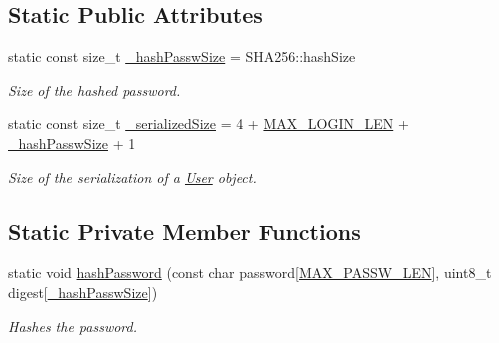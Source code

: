 \subsection*{Static Public Attributes}
\begin{DoxyCompactItemize}
\item 
\hypertarget{classUser_a2869314c4d5d41923d74150bea362140}{}static const size\+\_\+t \hyperlink{classUser_a2869314c4d5d41923d74150bea362140}{\+\_\+hash\+Passw\+Size} = S\+H\+A256\+::hash\+Size\label{classUser_a2869314c4d5d41923d74150bea362140}

\begin{DoxyCompactList}\small\item\em Size of the hashed password. \end{DoxyCompactList}\item 
\hypertarget{classUser_aded927fdcb2eacbe716c4fed1ed328ab}{}static const size\+\_\+t \hyperlink{classUser_aded927fdcb2eacbe716c4fed1ed328ab}{\+\_\+serialized\+Size} = 4 + \hyperlink{user_8hpp_a43842dcd60d621d7d9c9b9e4ecd76f78}{M\+A\+X\+\_\+\+L\+O\+G\+I\+N\+\_\+\+L\+E\+N} + \hyperlink{classUser_a2869314c4d5d41923d74150bea362140}{\+\_\+hash\+Passw\+Size} + 1\label{classUser_aded927fdcb2eacbe716c4fed1ed328ab}

\begin{DoxyCompactList}\small\item\em Size of the serialization of a \hyperlink{classUser}{User} object. \end{DoxyCompactList}\end{DoxyCompactItemize}
\subsection*{Static Private Member Functions}
\begin{DoxyCompactItemize}
\item 
\hypertarget{classUser_a653dfb41ba6ebce7769a448cfeb8c278}{}static void \hyperlink{classUser_a653dfb41ba6ebce7769a448cfeb8c278}{hash\+Password} (const char password\mbox{[}\hyperlink{user_8hpp_a510de8d20fed46d05c63ed414e8b595f}{M\+A\+X\+\_\+\+P\+A\+S\+S\+W\+\_\+\+L\+E\+N}\mbox{]}, uint8\+\_\+t digest\mbox{[}\hyperlink{classUser_a2869314c4d5d41923d74150bea362140}{\+\_\+hash\+Passw\+Size}\mbox{]})\label{classUser_a653dfb41ba6ebce7769a448cfeb8c278}

\begin{DoxyCompactList}\small\item\em Hashes the password. \end{DoxyCompactList}\end{DoxyCompactItemize}

